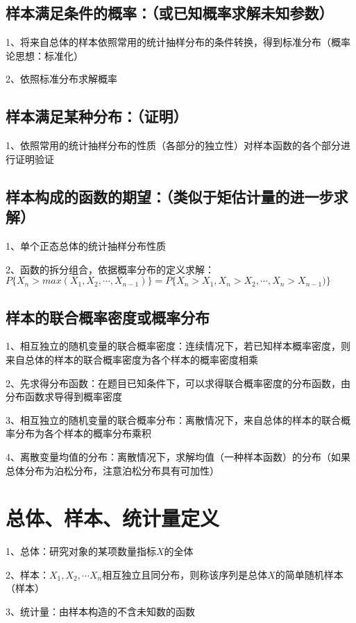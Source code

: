 \subsection{样本满足条件的概率：（或已知概率求解未知参数）}

1、将来自总体的样本依照常用的统计抽样分布的条件转换，得到标准分布（概率论思想：标准化）

2、依照标准分布求解概率



\subsection{样本满足某种分布：（证明）}

1、依照常用的统计抽样分布的性质（各部分的独立性）对样本函数的各个部分进行证明验证



\subsection{样本构成的函数的期望：（类似于矩估计量的进一步求解）}

1、单个正态总体的统计抽样分布性质

2、函数的拆分组合，依据概率分布的定义求解：$ P\{ X_n > max(X_1,X_2,\cdots,X_{n-1})\} = P\{ X_n > X_1,X_n >X_2,\cdots,X_n >X_{n-1})\} $



\subsection{样本的联合概率密度或概率分布}

1、相互独立的随机变量的联合概率密度：连续情况下，若已知样本概率密度，则来自总体的样本的联合概率密度为各个样本的概率密度相乘

2、先求得分布函数：在题目已知条件下，可以求得联合概率密度的分布函数，由分布函数求导得到概率密度

3、相互独立的随机变量的联合概率分布：离散情况下，来自总体的样本的联合概率分布为各个样本的概率分布乘积

4、离散变量均值的分布：离散情况下，求解均值（一种样本函数）的分布（如果总体分布为泊松分布，注意泊松分布具有可加性）

\section{总体、样本、统计量定义}

1、总体：研究对象的某项数量指标$ X $的全体

2、样本：$ X_1,X_2,\cdots X_n $相互独立且同分布，则称该序列是总体$ X $的简单随机样本（样本）

3、统计量：由样本构造的不含未知数的函数

